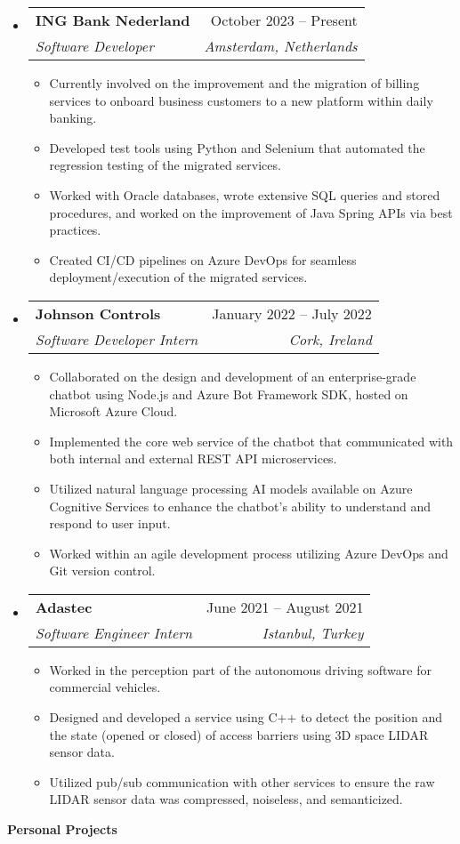 \documentclass[letterpaper,12pt]{article}[leftmargin=*]
\makeatletter
\def \entryspacing {-0pt}
\renewcommand{\section}[2]{\vspace{5pt}
  \colorbox{secondary}{\color{white}\raggedbottom\normalsize\textbf{{#1}{\hspace{7pt}#2}}}
}
\newcommand{\resumeEntryStart}{\begin{itemize}[leftmargin=2.5mm]}
\newcommand{\resumeEntryEnd}{\end{itemize}\vspace{\entryspacing}}
\newcommand{\resumeItemListStart}{\begin{itemize}[leftmargin=4.5mm]}
\newcommand{\resumeItemListEnd}{\end{itemize}}
\newcommand{\resumeItem}[1]{
  \item\small{
    {#1 \vspace{-2pt}}
  }
}
\newcommand{\resumeEntryTSDL}[4]{
  \vspace{-1pt}\item[]
    \begin{tabularx}{0.97\textwidth}{X@{\hspace{60pt}}r}
      \textbf{\color{primary}#1} & {\color{accent}\small#2} \\
      \textit{\color{accent}\small#3} & \textit{\color{accent}\small#4} \\
    \end{tabularx}\vspace{-6pt}
}
\makeatother
\begin{document}
  \resumeEntryStart
    \resumeEntryTSDL
      {ING Bank Nederland}{October 2023 -- Present}
      {Software Developer}{Amsterdam, Netherlands}
    \resumeItemListStart
      \resumeItem {Currently involved on the improvement and the migration of billing services to onboard business customers to a new platform within daily banking.}
      \resumeItem {Developed test tools using Python and Selenium that automated the regression testing of the migrated services.}
      \resumeItem {Worked with Oracle databases, wrote extensive SQL queries and stored procedures, and worked on the improvement of Java Spring APIs via best practices.}
      \resumeItem {Created CI/CD pipelines on Azure DevOps for seamless deployment/execution of the migrated services.}
    \resumeItemListEnd
  \resumeEntryEnd

  \resumeEntryStart
    \resumeEntryTSDL
      {Johnson Controls}{January 2022 -- July 2022}
      {Software Developer Intern}{Cork, Ireland}
    \resumeItemListStart
      \resumeItem {Collaborated on the design and development of an enterprise-grade chatbot using Node.js and Azure Bot Framework SDK, hosted on Microsoft Azure Cloud.}
      \resumeItem {Implemented the core web service of the chatbot that communicated with both internal and external REST API microservices.}
      \resumeItem {Utilized natural language processing AI models available on Azure Cognitive Services to enhance the chatbot's ability to understand and respond to user input.}
      \resumeItem {Worked within an agile development process utilizing Azure DevOps and Git version control.}
    \resumeItemListEnd
  \resumeEntryEnd

  \resumeEntryStart
    \resumeEntryTSDL
      {Adastec}{June 2021 -- August 2021}
      {Software Engineer Intern}{Istanbul, Turkey}
    \resumeItemListStart
      \resumeItem {Worked in the perception part of the autonomous driving software for commercial vehicles.}
      \resumeItem {Designed and developed a service using C++ to detect the position and the state (opened or closed) of access barriers using 3D space LIDAR sensor data.}
      \resumeItem {Utilized pub/sub communication with other services to ensure the raw LIDAR sensor data was compressed, noiseless, and semanticized.}
    \resumeItemListEnd
  \resumeEntryEnd


\section{\faFlask}{Personal Projects}
\end{document}
